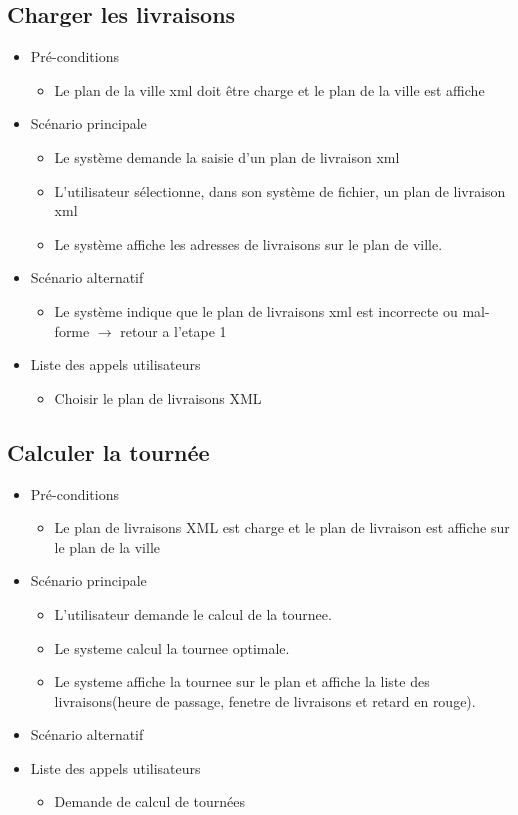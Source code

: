\documentclass[10pt,a4paper]{book}
\begin{document}
\subsection{Charger les livraisons}
\begin{itemize}
	\item{Pré-conditions}
	\begin{itemize}
		\item{Le plan de la ville xml doit être charge et le plan de la ville est affiche}
	\end{itemize}
	\item{Scénario principale}
	\begin{itemize}
		\item{Le système demande la saisie d’un plan de livraison xml}
		\item{L’utilisateur sélectionne, dans son système de fichier, un plan de livraison xml}
		\item{Le système affiche les adresses de livraisons sur le plan de ville.}
	\end{itemize}
	\item{Scénario alternatif}
	\begin{itemize}
		\item{Le système indique que le plan de livraisons xml est incorrecte ou mal-forme $\rightarrow$ retour a l’etape 1}
	\end{itemize}
	\item{Liste des appels utilisateurs}
	\begin{itemize}
		\item{Choisir le plan de livraisons XML}
	\end{itemize}
\end{itemize}
\subsection{Calculer la tournée}
\begin{itemize}
	\item{Pré-conditions}
	\begin{itemize}
		\item{Le plan de livraisons XML est charge et le plan de livraison est affiche sur le plan de la ville}
	\end{itemize}
	\item{Scénario principale}
	\begin{itemize}
		\item{L’utilisateur demande le calcul de la tournee.}
		\item{Le systeme calcul la tournee optimale.}
		\item{Le systeme affiche la tournee sur le plan et affiche la liste des livraisons(heure de passage, fenetre de livraisons et retard en rouge).}
	\end{itemize}
	\item{Scénario alternatif}
	\item{Liste des appels utilisateurs}
	\begin{itemize}
		\item{Demande de calcul de tournées}
	\end{itemize}
\end{itemize}
\end{document}
